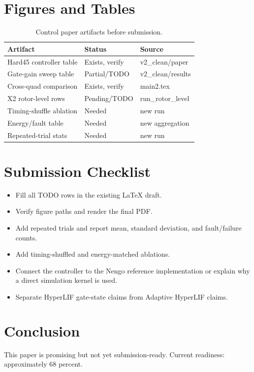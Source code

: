 \documentclass[journal]{IEEEtran}
\begin{document}
\section{Figures and Tables}
\begin{table}[t]
\centering
\caption{Control paper artifacts before submission.}
\begin{tabular}{lll}
\toprule
Artifact & Status & Source \\
\midrule
Hard45 controller table & Exists, verify & v2\_clean/paper \\
Gate-gain sweep table & Partial/TODO & v2\_clean/results \\
Cross-quad comparison & Exists, verify & main2.tex \\
X2 rotor-level rows & Pending/TODO & run\_rotor\_level \\
Timing-shuffle ablation & Needed & new run \\
Energy/fault table & Needed & new aggregation \\
Repeated-trial stats & Needed & new run \\
\bottomrule
\end{tabular}
\end{table}

\section{Submission Checklist}
\begin{itemize}
  \item Fill all TODO rows in the existing LaTeX draft.
  \item Verify figure paths and render the final PDF.
  \item Add repeated trials and report mean, standard deviation, and fault/failure counts.
  \item Add timing-shuffled and energy-matched ablations.
  \item Connect the controller to the Nengo reference implementation or explain why a direct simulation kernel is used.
  \item Separate HyperLIF gate-state claims from Adaptive HyperLIF claims.
\end{itemize}

\section{Conclusion}
This paper is promising but not yet submission-ready. Current readiness: approximately 68 percent.
\end{document}
